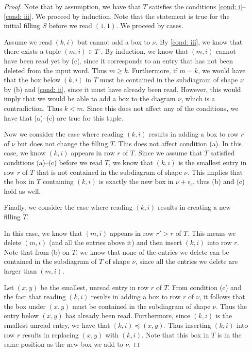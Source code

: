 \documentclass[10pt]{amsart}
\theoremstyle{plain}
\theoremstyle{definition}
\theoremstyle{plain}
\theoremstyle{plain}
\theoremstyle{remark}
\theoremstyle{plain}
\theoremstyle{plain}
\begin{document}
    \begin{proof}
    Note that by assumption, we have that $T$ satisfies the conditions \ref{cond: i}--\ref{cond: iii}. 
    We proceed by induction. Note that the statement is true for the initial filling $S$ before we read $(1,1)$. We proceed by cases.

    Assume we read $(k,i)$ but cannot add a box to $\nu$. By \ref{cond: iii}, we know that there exists a tuple $(m,i)\in T$ . By induction, we know that $(m,i)$ cannot have been read yet by (c), since it corresponds to an entry that has not been deleted from the input word. Thus $m\geq k$.
    Furthermore, if $m=k$, we would have that the box below $(k,i)$ in $T$ must be contained in the subdiagram of shape $\nu$ by (b) and \ref{cond: ii}, since it must have already been read. However, this would imply that we would be able to add a box to the diagram $\nu$, which is a contradiction. Thus $k<m$. Since this does not affect any of the conditions, we have that (a)--(c) are true for this tuple.

    Now we consider the case where reading $(k,i)$ results in adding a box to row $r$ of $\nu$ but does not change the filling $T$.
    This does not affect condition (a).     
    In this case, we know $(k,i)$ appears in row $r$ of $T$. Since we assume that $T$ satisfied conditions (a)--(c) before we read $T$, we know that $(k,i)$ is the smallest entry in row $r$ of $T$ that is not contained in the subdiagram of shape $\nu$. This implies that the box in $T$ containing $(k,i)$ is exactly the new box in $\nu + \epsilon_r$, thus (b) and (c) hold as well. 

    Finally, we consider the case where reading $(k,i)$ results in creating a new filling $\tilde{T}$. 

    In this case, we know that $(m,i)$ appears in row $r'>r$ of $T$.
    This means we delete $(m,i)$ (and all the entries above it) and then insert $(k,i)$ into row $r$. Note that from (b) on $T$, we know that none of the entries we delete can be contained in the subdiagram of $T$ of shape $\nu$, since all the entries we delete are larger than $(m,i)$. 

   Let $(x,y)$ be the smallest, unread entry in row $r$ of $T$. From condition (c) and the fact that reading $(k,i)$ results in adding a box to row $r$ of $\nu$, it follows that the box under $(x,y)$ must be contained in the subdiagram of shape $\nu$. Thus the entry below $(x,y)$ has already been read. Furthermore, since $(k,i)$ is the smallest unread entry, we have that $(k,i)\preceq (x,y)$. Thus inserting $(k,i)$ into row $r$ results in replacing $(x,y)$ with $(k,i)$. Note that this box in $\tilde{T}$ is in the same position as the new box we add to $\nu$. 


\end{proof}
\end{document}
